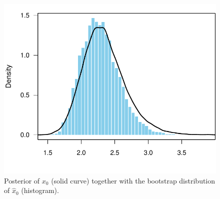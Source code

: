 \documentclass[cmfont,usenames,dvipsnames,leqno]{afit-etd}\usepackage[]{graphicx}\usepackage[]{color}
\makeatletter
\def\maxwidth{ %
  \ifdim\Gin@nat@width>\linewidth
    \linewidth
  \else
    \Gin@nat@width
  \fi
}
\newenvironment{knitrout}{}{} %
\renewenvironment{knitrout}{\begin{singlespace}}{\end{singlespace}}
\newcommand{\wh}[1]{\ensuremath{\widehat{#1}}}
\makeatother
\begin{document}
\begin{knitrout}
\color{fgcolor}\begin{figure}[H]

\includegraphics[width=\maxwidth]{figure/nasturtium-post-boot} \caption[Posterior and bootstrap results for the nasturtium example]{Posterior of $x_0$ (solid curve) together with the bootstrap distribution of $\wh{x}_0$ (histogram).\label{fig:nasturtium-post-boot}}
\end{figure}


\end{knitrout}
\end{document}

